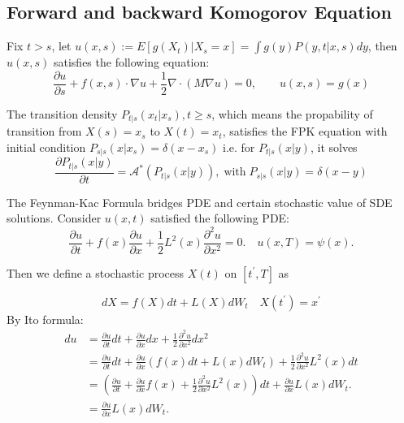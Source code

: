 \subsection{Forward and backward Komogorov Equation}
\begin{theorem}
    Fix $t>s$, let $u(x, s):= E\left[g(X_t)|X_s=x\right]=\int g(y)P(y, t|x, s)dy$, then $u(x, s)$ satisfies the following equation:
    \begin{equation}
        \frac{\partial u}{\partial s}+f(x, s)\cdot \nabla u+\frac{1}{2}\nabla \cdot (M\nabla u)=0, \qquad u(x, s)=g(x)
    \end{equation}
\end{theorem}

\begin{theorem}
     The transition density $P_{t|s}(x_t|x_s),t\geq s$, which means the propability of transition from $X(s)=x_s$ to $X(t)=x_t$, satisfies the FPK equation with initial condition $P_{s|s}(x|x_s)=\delta(x-x_s)$
     i.e. for $P_{t|s}(x|y)$, it solves
     \begin{equation}
        \frac{\partial P_{t|s}(x|y)}{\partial t}=\mathcal{A}^*(P_{t|s}(x|y)), \operatorname{with} P_{s|s}(x|y)=\delta(x-y)
     \end{equation}
\end{theorem}

The Feynman-Kac Formula bridges PDE and certain stochastic value of SDE solutions. Consider $u(x, t)$ satisfied the following PDE:
\begin{equation}
    \frac{\partial u}{\partial t}+f(x) \frac{\partial u}{\partial x}+\frac{1}{2} L^{2}(x) \frac{\partial^{2} u}{\partial x^{2}}=0 . \quad u(x, T)=\psi(x) .
\end{equation}

Then we define a stochastic process $X(t)$  on  $\left[t^{\prime}, T\right]$  as

\begin{equation}
    d X=f(X) d t+L(X) d W_{t} \quad X\left(t^{\prime}\right)=x^{\prime}
\end{equation}
By Ito formula:
\begin{equation}
    \begin{aligned}
    d u & =\frac{\partial u}{\partial t} d t+\frac{\partial u}{\partial x} d x+\frac{1}{2} \frac{\partial^{2} u}{\partial x^{2}} d x^{2} \\
    & =\frac{\partial u}{\partial t} d t+\frac{\partial u}{\partial x}\left(f(x) d t+L(x) d W_{t}\right)+\frac{1}{2} \frac{\partial^{2} u}{\partial x^{2}} L^{2}(x) d t \\
    & =\left(\frac{\partial u}{\partial t}+\frac{\partial u}{\partial x} f(x)+\frac{1}{2} \frac{\partial^{2} u}{\partial x^{2}} L^{2}(x)\right) d t+\frac{\partial u}{\partial x} L(x) d W_{t} . \\
    & =\frac{\partial u}{\partial x} L(x) d W_{t} .
    \end{aligned}
\end{equation}

